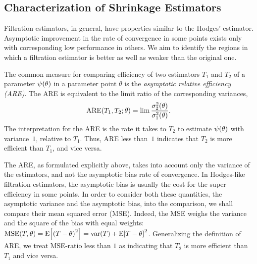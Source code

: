 \documentclass[ejs, twoside]{imsart}
\theoremstyle{plain}
\theoremstyle{remark}
\newcommand{\fullstop}{\text{.}}
\newcommand{\iid}{i.i.d.}
\newcommand{\MSE}{\operatorname{MSE}}
\numberwithin{equation}{section}
\numberwithin{table}{section}
\numberwithin{figure}{section}
\let\originalleft\left
\let\originalright\right
\renewcommand{\left}{\mathopen{}\mathclose\bgroup\originalleft}
\renewcommand{\right}{\aftergroup\egroup\originalright}
\begin{document}





\subsection{Characterization of Shrinkage Estimators} \label{sec:la-char}
Filtration estimators, in general, have properties similar to the Hodges' estimator. Asymptotic improvement in the rate of convergence in some points exists only with corresponding low performance in others. We aim to identify the regions in which a filtration estimator is better as well as weaker than the original one.


	The common measure for comparing efficiency of two estimators \(T_1\) and \(T_2\) of a parameter \(\psi\left(\theta \right) \) in a parameter point \(\theta\) is the \emph{asymptotic relative efficiency (ARE)}. The ARE is equivalent to the limit ratio of the corresponding variances,
	\[\operatorname{ARE}\left(T_1, T_2 ; \theta \right) = \lim \frac{\sigma_2^2\left(\theta\right)}{\sigma_1^2\left(\theta\right)} \fullstop\]
	The interpretation for the ARE is the rate it takes to \(T_2\) to estimate \(\psi\left(\theta \right) \) with variance~\(1\), relative to \(T_1\). Thus, ARE less than~\(1\) indicates that \(T_2\) is more efficient than \(T_1\), and vice versa.
	
	The ARE, as formulated explicitly above, takes into account only the variance of the estimators, and not the asymptotic bias rate of convergence. In Hodges-like filtration estimators, the asymptotic bias is usually the cost for the super-efficiency in some points. In order to consider both these quantities, the asymptotic variance and the asymptotic bias, into the comparison, we shall compare their mean squared error (MSE). Indeed, the MSE weighs the variance and the square of the bias with equal weights: \(\MSE\left(T,\theta \right) = \mean{\left(T-\theta \right)^2 } = \var{T} + \mean{T-\theta}^2 \). Generalizing the definition of ARE, we treat MSE-ratio less than \(1\) as indicating that \(T_2\) is more efficient than \(T_1\) and vice versa.
	
\end{document}
